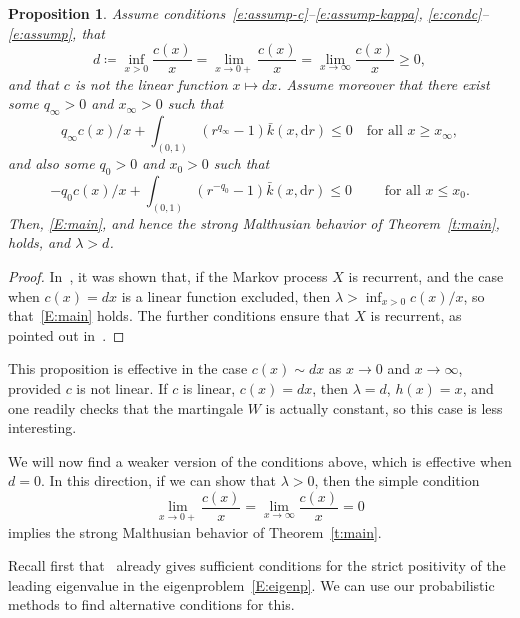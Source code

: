 \documentclass[11pt]{article}
\newtheorem{prop}[theo]{Proposition}
\theoremstyle{definition}
\providecommand{\mathof}[1]{\mathrm{#1}}
\numberwithin{equation}{section}
\numberwithin{figure}{section}
\numberwithin{table}{section}
\newcommand\dd{\mathof{d}}
\newcommand*{\MK}{\mkern 2mu}
\begin{document}
\begin{prop}\label{P0}
Assume conditions~\eqref{e:assump-c}--\eqref{e:assump-kappa}, \eqref{e:condc}--\eqref{e:assump}, that
\[
d \coloneqq \inf_{x>0} \frac{c(x)}{x} =\lim_{x\to 0+} \frac{c(x)}{x} = \lim_{x\to \infty} \frac{c(x)}{x} \geq 0,
\]
and that $c$ is not the linear function $x \mapsto dx$. Assume moreover that there exist some $q_{\infty}>0$ and $x_{\infty}>0$ such that
\begin{equation}\label{e:lyap1a}
q_{\infty} c(x)/x + \int_{(0,1)} (r^{q_{\infty}}-1)\bar k(x,\dd r) \leq 0 \quad\text{for all }x\geq x_{\infty},
\end{equation}
and also some $q_0>0$ and $x_0>0$ such that
\begin{equation}\label{e:lyap1b}
-q_0 c(x)/x + \int_{(0,1)} (r^{-q_0}-1) \bar k (x,\dd r) \leq 0
\qquad\text{ for all }x\leq x_0.
\end{equation}
Then, \eqref{E:main}, and hence the strong Malthusian behavior of Theorem~\ref{t:main}, holds, and $\lambda > d$.
\end{prop}



\begin{proof}
In~\cite[Proposition~3.4$\MK$(ii)]{BW}, it was shown that, if the Markov process $X$ is recurrent, and the case when $c(x)=dx$ is a linear function excluded, then $\lambda > \inf_{x>0}c(x)/x$, so that~\eqref{E:main} holds. The further conditions ensure that $X$ is recurrent, as pointed out in~\cite[Section~3.6]{BeFK}.
\end{proof}

This proposition is effective in the case $c(x) \sim dx$ as $x\to 0$ and $x\to\infty$, provided $c$ is not linear. If $c$ is linear, $c(x) = dx$, then $\lambda=d$, $h(x)=x$, and one readily checks that the martingale $W$ is actually constant, so this case is less interesting.

We will now find a weaker version of the conditions above, which is effective when $d=0$. In this direction, if we can show that $\lambda > 0$, then the simple condition
\begin{equation}\label{e:c0}
\lim_{x\to 0+}\frac{c(x)}{x} = \lim_{x\to \infty}\frac{c(x)}{x} =0
\end{equation}
implies the strong Malthusian behavior of Theorem~\ref{t:main}.

Recall first that~\cite[Theorem~1]{DoumGab} already gives sufficient conditions for the strict positivity of the leading eigenvalue in the eigenproblem~\eqref{E:eigenp}. We can use our probabilistic methods to find alternative conditions for this.
\end{document}
